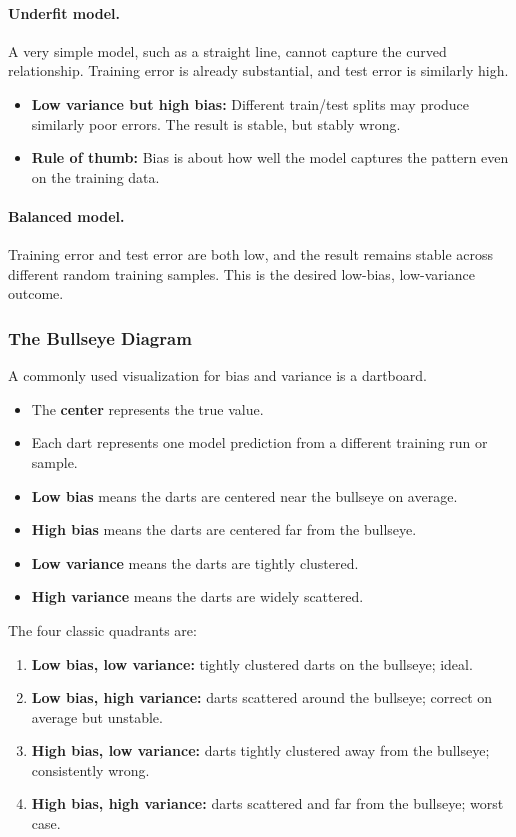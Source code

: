 \documentclass[12pt,openany]{book}
\begin{document}
\paragraph{Underfit model.}
A very simple model, such as a straight line, cannot capture the curved relationship. Training error is already substantial, and test error is similarly high.

\begin{itemize}[leftmargin=*]
    \item \textbf{Low variance but high bias:} Different train/test splits may produce similarly poor errors. The result is stable, but stably wrong.
    \item \textbf{Rule of thumb:} Bias is about how well the model captures the pattern even on the training data.
\end{itemize}

\paragraph{Balanced model.}
Training error and test error are both low, and the result remains stable across different random training samples. This is the desired low-bias, low-variance outcome.

\subsubsection{The Bullseye Diagram}

A commonly used visualization for bias and variance is a dartboard.

\begin{itemize}[leftmargin=*]
    \item The \textbf{center} represents the true value.
    \item Each dart represents one model prediction from a different training run or sample.
    \item \textbf{Low bias} means the darts are centered near the bullseye on average.
    \item \textbf{High bias} means the darts are centered far from the bullseye.
    \item \textbf{Low variance} means the darts are tightly clustered.
    \item \textbf{High variance} means the darts are widely scattered.
\end{itemize}

The four classic quadrants are:
\begin{enumerate}[leftmargin=*]
    \item \textbf{Low bias, low variance:} tightly clustered darts on the bullseye; ideal.
    \item \textbf{Low bias, high variance:} darts scattered around the bullseye; correct on average but unstable.
    \item \textbf{High bias, low variance:} darts tightly clustered away from the bullseye; consistently wrong.
    \item \textbf{High bias, high variance:} darts scattered and far from the bullseye; worst case.
\end{enumerate}
\end{document}
